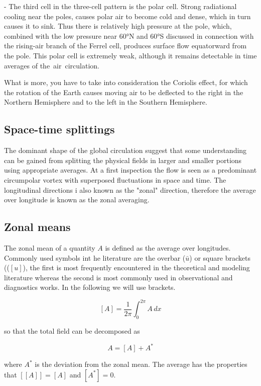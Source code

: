 - The third cell in the three-cell pattern is the polar cell. Strong radiational cooling near the poles, causes polar air to become cold and dense, which in turn causes it to sink. Thus there is relatively high pressure at the pole, which, combined with the low pressure near 60°N and 60°S discussed in connection with the rising-air branch of the Ferrel cell, produces surface flow equatorward from the pole. This polar cell is extremely weak, although it remains detectable in time averages of the air circulation. 

What is more, you have to take into consideration the Coriolis effect, for which the rotation of the Earth causes moving air to be deflected to the right in the Northern Hemisphere and to the left in the Southern Hemisphere. 

\subsection{Space-time splittings}\label{space-time-splittings}

The dominant shape of the global circulation suggest that some
understanding can be gained from splitting the physical fields in larger
and smaller portions using appropriate averages. At a first inspection
the flow is seen as a predominant circumpolar vortex with superposed
fluctuations in space and time. The longitudinal directions i also known as the "zonal" direction, therefore the average over longitude is known
as the zonal averaging.

\subsection{Zonal means}\label{zonal-means}

The zonal mean of a quantity \(A\) is defined as the average over
longitudes. Commonly used symbols int he literature are the overbar
(\(\bar{u}\)) or square brackets ((\([u]\)), the first is most
frequently encountered in the theoretical and modeling literature
whereas the second is most commonly used in observational and
diagnostics works. In the following we will use brackets.

\[[A] = \frac{1}{2\pi}\int_0^{2\pi} A \, dx\]

so that the total field can be decomposed as

\[A = [A] + A^*\]

where \(A^*\) is the deviation from the zonal mean. The average has the
properties that \([[A]] = [A]\) and \([A^*]=0\).

